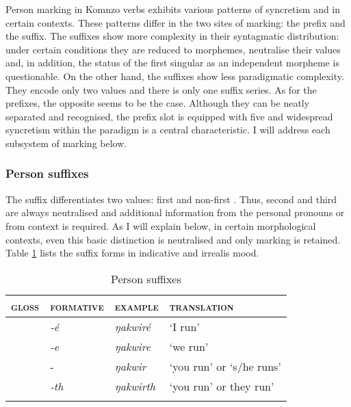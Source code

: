 Person marking in Komnzo verbs exhibits various patterns of syncretism and  in certain contexts. These patterns differ in the two sites of  marking: the prefix and the suffix. The suffixes show more complexity in their syntagmatic distribution: under certain conditions they are reduced to  morphemes, neutralise their  values and, in addition, the status of the first singular as an independent morpheme is questionable. On the other hand, the suffixes show less paradigmatic complexity. They encode only two  values and there is only one suffix series. As for the prefixes, the opposite seems to be the case. Although they can be neatly separated and recognised, the prefix slot is equipped with five  and widespread syncretism within the paradigm is a central characteristic. I will address each subsystem of  marking below.

\subsubsection{Person suffixes} \label{personsuffsection}

The  suffix differentiates two  values: first and non-first . Thus, second and third  are always neutralised and additional information from the personal pronouns or from context is required. As I will explain below, in certain morphological contexts, even this basic distinction is neutralised and only  marking is retained. Table \ref{perssuff} lists the suffix forms in indicative and irrealis mood.

\begin{table}
\caption{Person suffixes}
\label{perssuff}
	\begin{tabular}{llll}
		\lsptoprule
		\textsc{gloss} & \textsc{formative} & \textsc{example} &\textsc{translation}\\\hline
		\Fsg &\emph{-é} &\emph{ŋakwiré}	&`I run'\\
		\Fnsg &\emph{-e} &\emph{ŋakwire} &`we run'\\
		\Stsg &-\Zero &\emph{ŋakwir} &`you run' or `s/he runs'\\
		\Stnsg &\emph{-th} &\emph{ŋakwirth}	&`you run' or they run'\\
		\lspbottomrule
	\end{tabular}
\end{table}%

